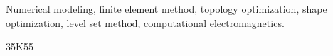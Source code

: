 \documentclass[review,hidelinks,onefignum,onetabnum]{siamart220329}
\begin{document}
%
%
\maketitle

\begin{abstract}
  \lipsum[1]
\end{abstract}

\begin{keywords}
    Numerical modeling, finite element method, topology optimization, shape optimization, level set method, computational electromagnetics. 
\end{keywords}

\begin{MSCcodes}
    35K55
\end{MSCcodes}
%
%
\end{document}
